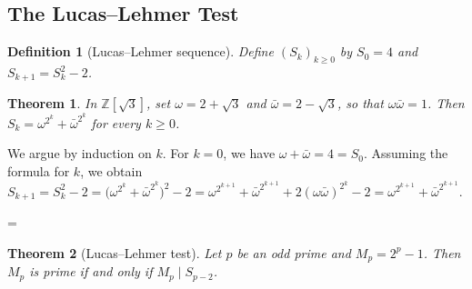 \documentclass[11pt]{article}
\makeatletter
\theoremstyle{ntstyle}
\newtheorem{theorem}{Theorem}[subsection]
\newtheorem{definition}{Definition}[subsection]
\let\nt@closedisplay\]
\def\nt@guardedclose{\@ifnextchar\par{\nt@closeafterpar}{\@ifnextchar\end{\postdisplaypenalty\@M\nt@closedisplay}{\nt@closedisplay}}}
\def\nt@closeafterpar\par{\@ifnextchar\par{\nt@closeafterpar}{\@ifnextchar\end{\postdisplaypenalty\@M\nt@closedisplay\par}{\nt@closedisplay\par}}}
\renewenvironment{proof}[1][\proofname]{\par
  \pushQED{\qed}\normalfont\topsep\medskipamount\edef\nt@afterproof{\@endparpenalty=\the\@endparpenalty\relax}\@beginparpenalty\@M\@endparpenalty\@M\let\]\nt@guardedclose\trivlist\item[]\textit{#1\@addpunct{.}} \ignorespaces}{\ifvmode\addpenalty\@M\fi\popQED\nt@afterproof\endtrivlist\@endpefalse}
\makeatother
\begin{document}
\subsection{The Lucas--Lehmer Test}

\begin{definition}[Lucas--Lehmer sequence]\label{def:9.3.1} Define
	$(S_k)_{k\ge0}$ by $S_0=4$ and $S_{k+1}=S_k^2-2$.

\end{definition}
\begin{theorem}\label{thm:9.3.1} In
	$\mathbb{Z}[\sqrt{3}]$, set $\omega=2+\sqrt{3}$ and $\bar\omega=2-\sqrt{3}$,
	so that $\omega\bar\omega=1$. Then
	$S_k=\omega^{2^k}+\bar\omega^{2^k}$ for every $k\ge0$.

\end{theorem}

\begin{proof} We argue by induction on $k$. For $k=0$,
	we have $\omega+\bar\omega=4=S_0$. Assuming the formula for $k$, we obtain
	$S_{k+1}=S_k^2-2=\big(\omega^{2^k}+\bar\omega^{2^k}\big)^2-2=\omega^{2^{k+1}}+\bar\omega^{2^{k+1}}+2(\omega\bar\omega)^{2^k}-2=\omega^{2^{k+1}}+\bar\omega^{2^{k+1}}$.

\end{proof}
\begin{theorem}[Lucas--Lehmer test]\label{thm:9.3.2} Let $p$ be an
	odd prime and $M_p=2^p-1$. Then $M_p$ is prime if and only if $M_p\mid S_{p-2}$.

\end{theorem}
\end{document}
